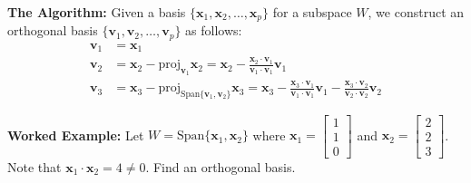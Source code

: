 \documentclass[11pt, letterpaper]{article}
\theoremstyle{definition}
\theoremstyle{remark}
\begin{document}
\textbf{The Algorithm:} Given a basis $\{\mathbf{x}_1, \mathbf{x}_2, \dots, \mathbf{x}_p\}$ for a subspace $W$, we construct an orthogonal basis $\{\mathbf{v}_1, \mathbf{v}_2, \dots, \mathbf{v}_p\}$ as follows:
\begin{align*}
    \mathbf{v}_1 &= \mathbf{x}_1 \\
    \mathbf{v}_2 &= \mathbf{x}_2 - \text{proj}_{\mathbf{v}_1} \mathbf{x}_2 = \mathbf{x}_2 - \frac{\mathbf{x}_2 \cdot \mathbf{v}_1}{\mathbf{v}_1 \cdot \mathbf{v}_1}\mathbf{v}_1 \\
    \mathbf{v}_3 &= \mathbf{x}_3 - \text{proj}_{\text{Span}\{\mathbf{v}_1, \mathbf{v}_2\}} \mathbf{x}_3 = \mathbf{x}_3 - \frac{\mathbf{x}_3 \cdot \mathbf{v}_1}{\mathbf{v}_1 \cdot \mathbf{v}_1}\mathbf{v}_1 - \frac{\mathbf{x}_3 \cdot \mathbf{v}_2}{\mathbf{v}_2 \cdot \mathbf{v}_2}\mathbf{v}_2
\end{align*}

\textbf{Worked Example:}
Let $W = \text{Span}\{\mathbf{x}_1, \mathbf{x}_2\}$ where $\mathbf{x}_1 = \begin{bmatrix} 1 \\ 1 \\ 0 \end{bmatrix}$ and $\mathbf{x}_2 = \begin{bmatrix} 2 \\ 2 \\ 3 \end{bmatrix}$. Note that $\mathbf{x}_1 \cdot \mathbf{x}_2 = 4 \neq 0$. Find an orthogonal basis.
\end{document}

